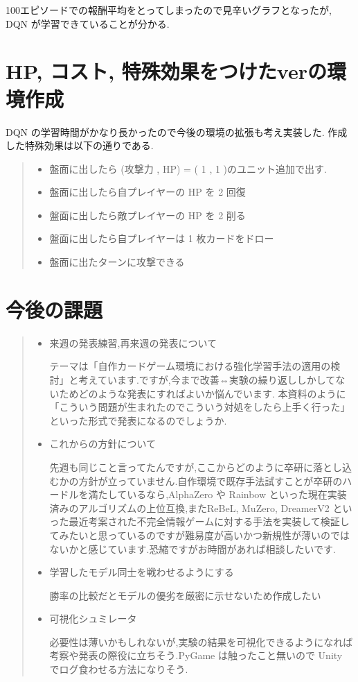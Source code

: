 \documentclass{jarticle}     %
\begin{document}
100エピソードでの報酬平均をとってしまったので見辛いグラフとなったが, DQN が学習できていることが分かる.



\section{HP, コスト, 特殊効果をつけたverの環境作成}
DQN の学習時間がかなり長かったので今後の環境の拡張も考え実装した.
作成した特殊効果は以下の通りである.
\begin{quote}
  \begin{itemize}
   \item 盤面に出したら (攻撃力 , HP) = ( 1 , 1 )のユニット追加で出す.
   \item 盤面に出したら自プレイヤーの HP を 2 回復
   \item 盤面に出したら敵プレイヤーの HP を 2 削る
   \item 盤面に出したら自プレイヤーは 1 枚カードをドロー
   \item 盤面に出たターンに攻撃できる
  \end{itemize}
 \end{quote}


\section{今後の課題}
\begin{quote}
  \begin{itemize}
   \item 来週の発表練習,再来週の発表について
   \par
   テーマは「自作カードゲーム環境における強化学習手法の適用の検討」と考えています.ですが,今まで改善⇔実験の繰り返ししかしてないためどのような発表にすればよいか悩んでいます. 本資料のように「こういう問題が生まれたのでこういう対処をしたら上手く行った」といった形式で発表になるのでしょうか.

   \item これからの方針について
   \par
   先週も同じこと言ってたんですが,ここからどのように卒研に落とし込むかの方針が立っていません.自作環境で既存手法試すことが卒研のハードルを満たしているなら,AlphaZero や Rainbow といった現在実装済みのアルゴリズムの上位互換,またReBeL\cite{ReBeL}, MuZero\cite{MuZero}, DreamerV2\cite{DreamerV2} といった最近考案された不完全情報ゲームに対する手法を実装して検証してみたいと思っているのですが難易度が高いかつ新規性が薄いのではないかと感じています.恐縮ですがお時間があれば相談したいです.

   \item 学習したモデル同士を戦わせるようにする
   \par
   勝率の比較だとモデルの優劣を厳密に示せないため作成したい

   \item 可視化シュミレータ
   \par
   必要性は薄いかもしれないが,実験の結果を可視化できるようになれば考察や発表の際役に立ちそう.PyGame は触ったこと無いので Unity でログ食わせる方法になりそう.
  \end{itemize}
 \end{quote}



\end{document}
